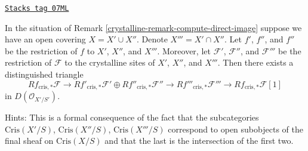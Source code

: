 \begin{remark}

\label{crystalline-remark-mayer-vietoris}
\href{https://stacks.math.columbia.edu/tag/07ML}{\texttt{Stacks tag 07ML}}

In the situation of Remark \ref{crystalline-remark-compute-direct-image}
suppose we have an open covering $X = X' \cup X''$. Denote
$X''' = X' \cap X''$. Let $f'$, $f''$, and $f''$ be the restriction of $f$
to $X'$, $X''$, and $X'''$. Moreover, let $\mathcal{F}'$, $\mathcal{F}''$,
and $\mathcal{F}'''$ be the restriction of $\mathcal{F}$ to the crystalline
sites of $X'$, $X''$, and $X'''$. Then there exists a distinguished triangle
$$
Rf_{\text{cris}, *}\mathcal{F}
\longrightarrow
Rf'_{\text{cris}, *}\mathcal{F}' \oplus Rf''_{\text{cris}, *}\mathcal{F}''
\longrightarrow
Rf'''_{\text{cris}, *}\mathcal{F}'''
\longrightarrow
Rf_{\text{cris}, *}\mathcal{F}[1]
$$
in $D(\mathcal{O}_{X'/S'})$.

\medskip\noindent
Hints: This is a formal consequence of the fact that the subcategories
$\text{Cris}(X'/S)$, $\text{Cris}(X''/S)$, $\text{Cris}(X'''/S)$ correspond
to open subobjects of the final sheaf on $\text{Cris}(X/S)$ and that the
last is the intersection of the first two.
\end{remark}

